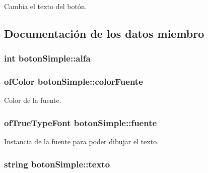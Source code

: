 Cambia el texto del botón. 



\subsection{Documentación de los datos miembro}
\hypertarget{classboton_simple_aa3af0794b6ec6ce74ffb15746bb6fc3c}{}
\subsubsection[{alfa}]{\setlength{\rightskip}{0pt plus 5cm}int boton\+Simple\+::alfa\hspace{0.3cm}{\ttfamily [private]}}\label{classboton_simple_aa3af0794b6ec6ce74ffb15746bb6fc3c}
\hypertarget{classboton_simple_a675afe5f4260c740b013c84dff6e60e1}{}
\subsubsection[{color\+Fuente}]{\setlength{\rightskip}{0pt plus 5cm}of\+Color boton\+Simple\+::color\+Fuente\hspace{0.3cm}{\ttfamily [private]}}\label{classboton_simple_a675afe5f4260c740b013c84dff6e60e1}


Color de la fuente. 

\hypertarget{classboton_simple_aca3777162256e66600ed386b887e4414}{}
\subsubsection[{fuente}]{\setlength{\rightskip}{0pt plus 5cm}of\+True\+Type\+Font boton\+Simple\+::fuente\hspace{0.3cm}{\ttfamily [private]}}\label{classboton_simple_aca3777162256e66600ed386b887e4414}


Instancia de la fuente para poder dibujar el texto. 

\hypertarget{classboton_simple_a6093d1fa34187d1f74182f59de6459b9}{}
\subsubsection[{texto}]{\setlength{\rightskip}{0pt plus 5cm}string boton\+Simple\+::texto\hspace{0.3cm}{\ttfamily [private]}}\label{classboton_simple_a6093d1fa34187d1f74182f59de6459b9}


